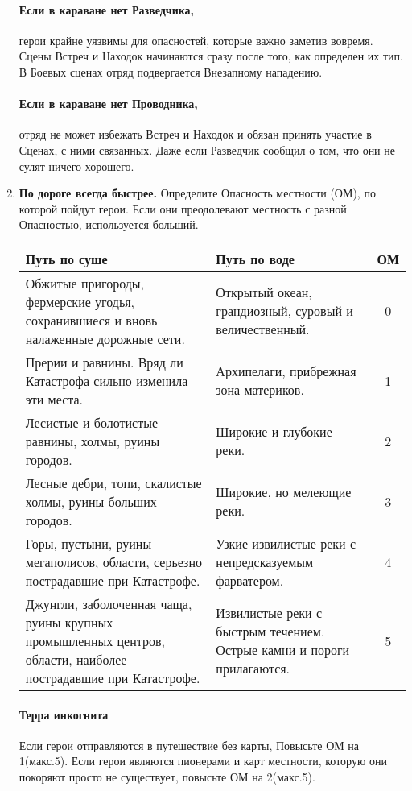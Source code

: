 \begin{enumerate}
    \paragraph{Если в караване нет Разведчика,} герои крайне уязвимы для опасностей, которые важно заметив вовремя. Сцены Встреч и Находок начинаются сразу после того, как определен их тип. В Боевых сценах отряд подвергается Внезапному нападению.
    \paragraph{Если в караване нет Проводника,} отряд не может избежать Встреч и Находок и обязан принять участие в Сценах, с ними связанных. Даже если Разведчик сообщил о том, что они не сулят ничего хорошего.

    \item \textbf{По дороге всегда быстрее.} Определите Опасность местности (ОМ), по которой пойдут герои. Если они преодолевают местность с разной Опасностью, используется больший.
    \begin{center} \begin{tabular}{|p{7cm}|p{7cm}|c|} \hline
      \textbf{Путь по суше} & \textbf{Путь по воде} & \textbf{ОМ} \\ \hline
      Обжитые пригороды, фермерские угодья, сохранившиеся и вновь налаженные дорожные сети. & Открытый океан, грандиозный, суровый и величественный. & 0 \\ \hline
      Прерии и равнины. Вряд ли Катастрофа сильно изменила эти места.  & Архипелаги, прибрежная зона материков. & 1 \\ \hline
      Лесистые и болотистые равнины, холмы, руины городов. & Широкие и глубокие реки. & 2 \\ \hline
      Лесные дебри, топи, скалистые холмы, руины больших городов. & Широкие, но мелеющие реки. & 3 \\ \hline
      Горы, пустыни, руины мегаполисов, области, серьезно пострадавшие при Катастрофе. & Узкие извилистые реки с непредсказуемым фарватером. & 4 \\ \hline
      Джунгли, заболоченная чаща, руины крупных промышленных центров, области, наиболее пострадавшие при Катастрофе. & Извилистые реки с быстрым течением. Острые камни и пороги прилагаются. & 5 \\ \hline
    \end{tabular} \end{center}
    \begin{tcolorbox}
      \paragraph{Терра инкогнита} Если герои отправляются в путешествие без карты, Повысьте ОМ на 1(макс.5). Если герои являются пионерами и карт местности, которую они покоряют просто не существует, повысьте ОМ на 2(макс.5).
    \end{tcolorbox}


\end{enumerate}

